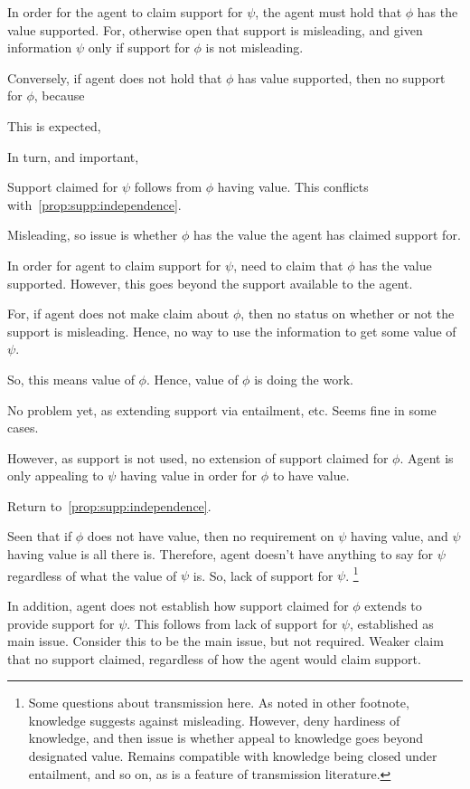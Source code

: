   
\begin{note}[???]
  \color{red}
  In order for the agent to claim support for \(\psi\), the agent must hold that \(\phi\) has the value supported.
  For, otherwise open that support is misleading, and given information \(\psi\) only if support for \(\phi\) is not misleading.

  Conversely, if agent does not hold that \(\phi\) has value supported, then no support for \(\phi\), because 

  
  This is expected, 

  In turn, and important,

  Support claimed for \(\psi\) follows from \(\phi\) having value.
  This conflicts with~\autoref{prop:supp:independence}.
  

  


  Misleading, so issue is whether \(\phi\) has the value the agent has claimed support for.

  In order for agent to claim support for \(\psi\), need to claim that \(\phi\) has the value supported.
  However, this goes beyond the support available to the agent.

  For, if agent does not make claim about \(\phi\), then no status on whether or not the support is misleading.
  Hence, no way to use the information to get some value of \(\psi\).

  So, this means value of \(\phi\).
  Hence, value of \(\phi\) is doing the work.

  No problem yet, as extending support via entailment, etc.
  Seems fine in some cases.

  However, as support is not used, no extension of support claimed for \(\phi\).
  Agent is only appealing to \(\psi\) having value in order for \(\phi\) to have value.

  Return to~\autoref{prop:supp:independence}.
  \propSuppIndependence{}

  Seen that if \(\phi\) does not have value, then no requirement on \(\psi\) having value, and \(\psi\) having value is all there is.
  Therefore, agent doesn't have anything to say for \(\psi\) regardless of  what the value of \(\psi\) is.
  So, lack of support for \(\psi\).\nolinebreak
  \footnote{
    Some questions about transmission here.
    As noted in other footnote, knowledge suggests against misleading.
    However, deny hardiness of knowledge, and then issue is whether appeal to knowledge goes beyond designated value.
    Remains compatible with knowledge being closed under entailment, and so on, as is a feature of transmission literature.
  }

  In addition, agent does not establish how support claimed for \(\phi\) extends to provide support for \(\psi\).
  This follows from lack of support for \(\psi\), established as main issue.
  Consider this to be the main issue, but not required.
  Weaker claim that no support claimed, regardless of how the agent would claim support.
\end{note}

